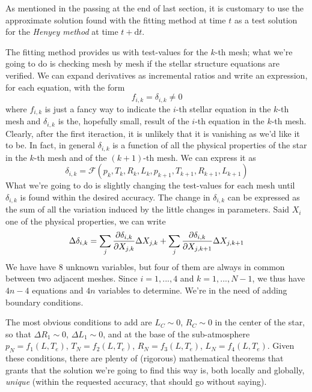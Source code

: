 As mentioned in the passing at the end of last section, it is customary to use the approximate solution found with the fitting method at time $t$ as a test solution for the \emph{Henyey method} \cite{1964ApJ...139..306H} \cite{1987ApJ...312..217B} at time $t+\text{d}t$.
\par The fitting method provides us with test-values for the $k$-th mesh; what we're going to do is checking mesh by mesh if the stellar structure equations are verified. We can expand derivatives as incremental ratios and write an expression, for each equation, with the form 
\begin{equation*}
    f_{i,k} = \delta_{i,k} \neq 0
\end{equation*}
where $f_{i,k}$ is just a fancy way to indicate the $i$-th stellar equation in the $k$-th mesh and $\delta_{i,k}$ is the, hopefully small, result of the $i$-th equation in the $k$-th mesh. Clearly, after the first iteraction, it is unlikely that it is vanishing as we'd like it to be. In fact, in general $\delta_{i,k}$ is a function of all the physical properties of the star in the $k$-th mesh and of the $(k+1)$-th mesh. We can express it as 
\begin{equation*}
    \delta_{i,k} = \mathcal{F}(p_{k}, T_{k}, R_{k}, L_{k},p_{k+1}, T_{k+1}, R_{k+1}, L_{k+1})
\end{equation*}
What we're going to do is slightly changing the test-values for each mesh until $\delta_{i,k}$ is found within the desired accuracy. The change in $\delta_{i,k}$ can be expressed as the sum of all the variation induced by the little changes in parameters. Said $X_{i}$ one of the physical properties, we can write
\begin{equation*}
    \Delta\delta_{i,k} = \sum_{j}\frac{\partial \delta_{i,k}}{\partial X_{j,k}}\Delta X_{j,k} + \sum_{j}\frac{\partial \delta_{i,k}}{\partial X_{j,k+1}}\Delta X_{j,k+1}
\end{equation*}
We have have 8 unknown variables, but four of them are always in common between two adjacent meshes. Since $i = 1,...,4$ and $k=1,...,N-1$, we thus have $4n-4$ equations and $4n$ variables to determine. We're in the need of adding boundary conditions. 
\par The most obvious conditions to add are $L_{C}\sim 0$, $R_{C}\sim 0$ in the center of the star, so that $\Delta R_{1}\sim 0$, $\Delta L_{1}\sim 0$, and at the base of the sub-atmosphere $p_{N} = f_{1}(L,T_{e})$, $T_{N} = f_{2}(L,T_{e})$, $R_{N} = f_{3}(L,T_{e})$, $L_{N} = f_{4}(L,T_{e})$. Given these conditions, there are plenty of (rigorous) mathematical theorems that grants that the solution we're going to find this way is, both locally and globally, \emph{unique} (within the requested accuracy, that should go without saying).


